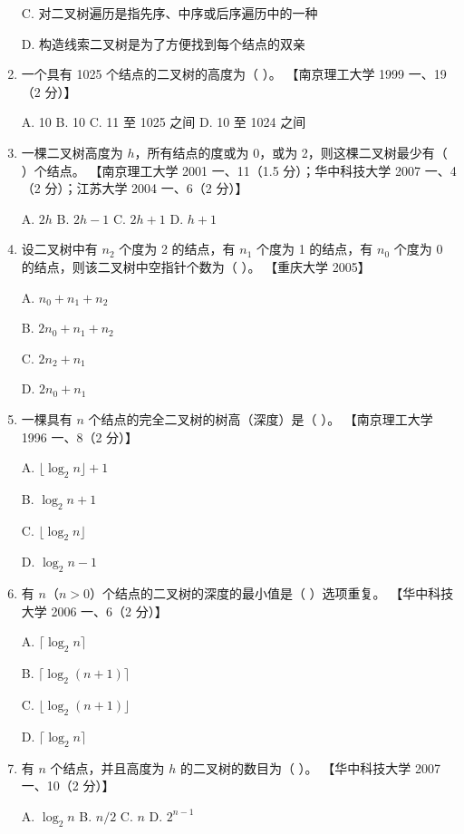 \documentclass[lang=cn,newtx,10pt,scheme=chinese]{../../elegantbook}
\begin{document}
\begin{enumerate}
    C. 对二叉树遍历是指先序、中序或后序遍历中的一种  

    D. 构造线索二叉树是为了方便找到每个结点的双亲  

    \item 一个具有 1025 个结点的二叉树的高度为（ ）。  
    【南京理工大学 1999 一、19（2 分）】  

    A. 10 \quad B. 10 \quad C. 11 至 1025 之间 \quad D. 10 至 1024 之间  

    \item 一棵二叉树高度为 $h$，所有结点的度或为 0，或为 2，则这棵二叉树最少有（ ）个结点。  
    【南京理工大学 2001 一、11（1.5 分）；华中科技大学 2007 一、4（2 分）；江苏大学 2004 一、6（2 分）】  

    A. $2h$ \quad B. $2h - 1$ \quad C. ${2h+1}$ \quad D. $h + 1$  

    \item 设二叉树中有 $n_2$ 个度为 2 的结点，有 $n_1$ 个度为 1 的结点，有 $n_0$ 个度为 0 的结点，则该二叉树中空指针个数为（ ）。  
    【重庆大学 2005】  

    A. $n_0 + n_1 + n_2$  

    B. $2n_0 + n_1 + n_2$  

    C. $2n_2 + n_1$  

    D. $2n_0 + n_1 $  

    \item 一棵具有 $n$ 个结点的完全二叉树的树高（深度）是（ ）。  
    【南京理工大学 1996 一、8（2 分）】  

    A. $\lfloor \log_2 n \rfloor + 1$  

    B. $ \log_2 n  + 1$ 

    C. $ \lfloor \log_2 n \rfloor$  

    D. $\log_2 n - 1$  

    \item 有 $n$（$n > 0$）个结点的二叉树的深度的最小值是（ ）选项重复。  
    【华中科技大学 2006 一、6（2 分）】  

    A. $\lceil \log_2 n \rceil$  
    
    B. $\lceil \log_2 (n + 1) \rceil$  

    C. $\lfloor \log_2 (n + 1) \rfloor$  

    D. $\lceil \log_2 n \rceil$  

    \item 有 $n$ 个结点，并且高度为 $h$ 的二叉树的数目为（ ）。  
    【华中科技大学 2007 一、10（2 分）】 

    A. $\log_2 n$ \quad B. $n / 2$ \quad C. $n$ \quad D. $2^{n-1}$  


\end{enumerate}
\end{document}

